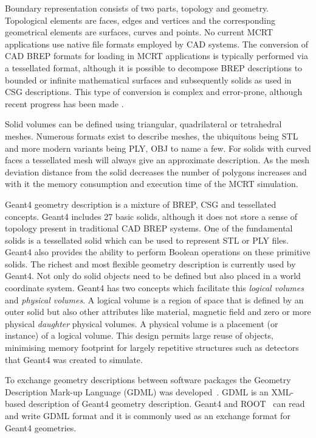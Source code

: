 \documentclass[final,5p,times,twocolumn]{elsarticle}
\begin{document}
Boundary representation consists of two parts, topology and geometry. Topological elements are faces, edges and vertices and the corresponding
geometrical elements are surfaces, curves and points. No current MCRT applications use native file formats employed by CAD systems. The conversion of 
CAD BREP formats for loading in MCRT applications is typically performed via a tessellated format, although it is possible to decompose BREP descriptions
 to bounded or infinite mathematical surfaces and subsequently solids as used in CSG descriptions. This type of conversion is complex and error-prone, 
 although recent progress has been made \cite{WangNuclSciTech31-82-2020}.

Solid volumes can be defined using triangular, quadrilateral or tetrahedral meshes. Numerous formats exist to describe meshes, the ubiquitous being STL and 
more modern variants being PLY, OBJ to name a few. For solids with curved faces a tessellated mesh will always give an approximate description. As the mesh 
deviation distance from the solid decreases the number of polygons increases and with it the memory consumption and execution time of the MCRT simulation. 

Geant4 geometry description is a mixture of BREP, CSG and tessellated concepts. Geant4 includes 27 basic solids, although it does not store a sense 
of topology present in traditional CAD BREP systems. One of the fundamental solids is a tessellated solid which can be used to represent STL or PLY files. 
Geant4 also provides the ability to perform Boolean operations on these primitive solids. The richest and most flexible geometry description is currently used by
Geant4. Not only do solid objects need to be defined but also placed in a world coordinate system. Geant4 has two concepts which facilitate this {\em logical volumes} 
and {\em physical volumes}. A logical volume is a region of space that is defined by an outer solid but also other attributes like material, magnetic field 
and zero or more physical {\em daughter} physical volumes. A physical volume is a placement (or instance) of a logical volume. This design permits large reuse 
of objects, minimising memory footprint for largely repetitive structures such as detectors that Geant4 was created to simulate.  


To exchange geometry descriptions between software packages the Geometry Description Mark-up Language (GDML) was developed~\cite{GDML}. 
GDML is an XML-based description of Geant4 geometry description. Geant4 and ROOT~\cite{fons_rademakers_2019_3895860} can read and write 
GDML format and it is commonly used as an exchange format for Geant4 geometries. 
\end{document}
